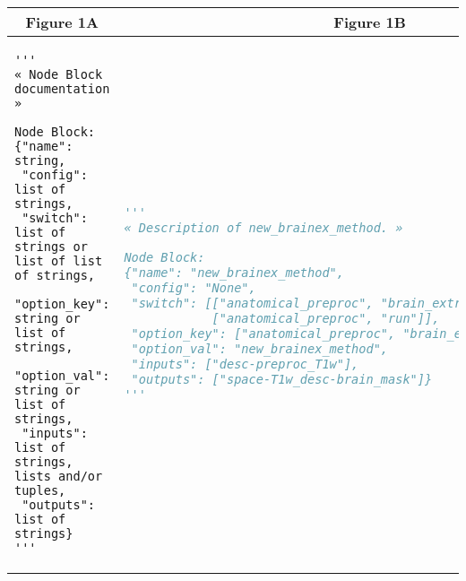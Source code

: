 \documentclass[varwidth=\maxdimen]{standalone}
\begin{document}
  \begin{tabular}[t]{ @{}|l|l| }
    \multicolumn{1}{c|}{Figure 1A} & \multicolumn{1}{|c}{Figure 1B} \\
    \hline
    \begin{lstlisting}
'''
« Node Block documentation »

Node Block:
{"name": string,
 "config": list of strings,
 "switch": list of strings or list of list of strings,
 "option_key": string or list of strings,
 "option_val": string or list of strings,
 "inputs": list of strings, lists and/or tuples,
 "outputs": list of strings}
'''\end{lstlisting} & \begin{lstlisting}[language=Python]
'''
« Description of new_brainex_method. »

Node Block:
{"name": "new_brainex_method",
 "config": "None",
 "switch": [["anatomical_preproc", "brain_extraction", "run"],
            ["anatomical_preproc", "run"]],
 "option_key": ["anatomical_preproc", "brain_extraction", "using"],
 "option_val": "new_brainex_method",
 "inputs": ["desc-preproc_T1w"],
 "outputs": ["space-T1w_desc-brain_mask"]}
'''\end{lstlisting} \\
    \hline
  \end{tabular}
\end{document}
